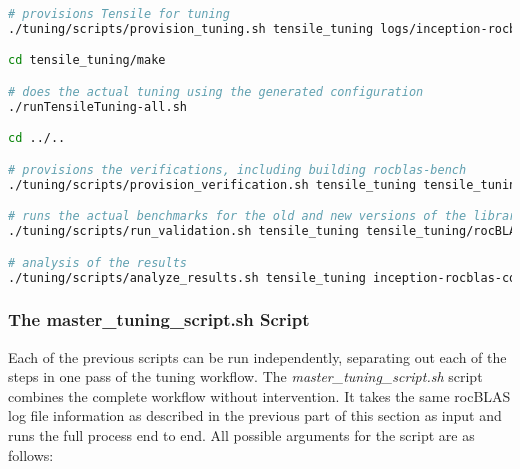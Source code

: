 \documentclass[]{article}
\begin{document}
\begin{lstlisting}[language=bash,breaklines=true]
# provisions Tensile for tuning
./tuning/scripts/provision_tuning.sh tensile_tuning logs/inception-rocblas-configs_unique.log tf_inception.yaml vega20

cd tensile_tuning/make

# does the actual tuning using the generated configuration
./runTensileTuning-all.sh

cd ../..

# provisions the verifications, including building rocblas-bench
./tuning/scripts/provision_verification.sh tensile_tuning tensile_tuning/tensile/Tensile vega20

# runs the actual benchmarks for the old and new versions of the library
./tuning/scripts/run_validation.sh tensile_tuning tensile_tuning/rocBLAS/

# analysis of the results
./tuning/scripts/analyze_results.sh tensile_tuning inception-rocblas-configs_unique.log vega20 -s 2 -f 1301
\end{lstlisting}

\subsubsection{The master\_tuning\_script.sh Script}

Each of the previous scripts can be run independently, separating out each of the steps in one pass of the tuning workflow. The \emph{master\_tuning\_script.sh} script combines the complete workflow without intervention. It takes the same rocBLAS log file information as described in the previous part of this section as input and runs the full process end to end. All possible arguments for the script are as follows:
\end{document}

